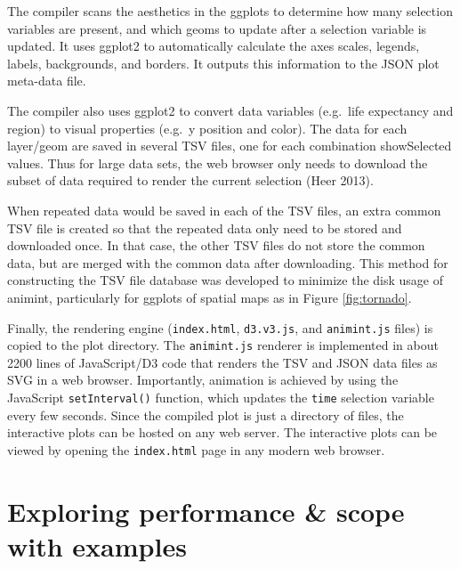\documentclass[12pt,]{article}
\theoremstyle{definition}
\theoremstyle{definition}
\theoremstyle{remark}
\begin{document}
The compiler scans the aesthetics in the ggplots to determine how many
selection variables are present, and which geoms to update after a
selection variable is updated. It uses ggplot2 to automatically
calculate the axes scales, legends, labels, backgrounds, and borders. It
outputs this information to the JSON plot meta-data file.

The compiler also uses ggplot2 to convert data variables (e.g.~life
expectancy and region) to visual properties (e.g.~y position and color).
The data for each layer/geom are saved in several TSV files, one for
each combination showSelected values. Thus for large data sets, the web
browser only needs to download the subset of data required to render the
current selection (Heer 2013).

When repeated data would be saved in each of the TSV files, an extra
common TSV file is created so that the repeated data only need to be
stored and downloaded once. In that case, the other TSV files do not
store the common data, but are merged with the common data after
downloading. This method for constructing the TSV file database was
developed to minimize the disk usage of animint, particularly for
ggplots of spatial maps as in Figure \ref{fig:tornado}.

Finally, the rendering engine (\texttt{index.html}, \texttt{d3.v3.js},
and \texttt{animint.js} files) is copied to the plot directory. The
\texttt{animint.js} renderer is implemented in about 2200 lines of
JavaScript/D3 code that renders the TSV and JSON data files as SVG in a
web browser. Importantly, animation is achieved by using the JavaScript
\texttt{setInterval()} function, which updates the \texttt{time}
selection variable every few seconds. Since the compiled plot is just a
directory of files, the interactive plots can be hosted on any web
server. The interactive plots can be viewed by opening the
\texttt{index.html} page in any modern web browser.

\section{Exploring performance \& scope with
examples}\label{performance}
\end{document}

